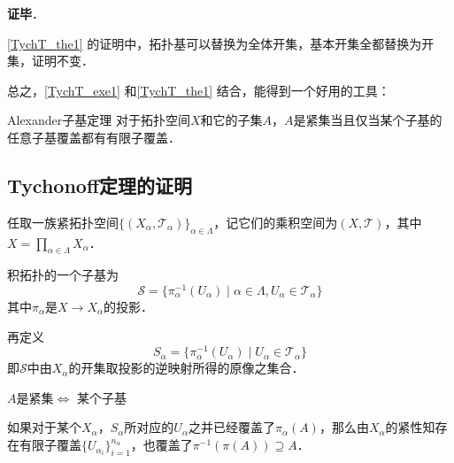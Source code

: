 \textbf{证毕}．



\autoref{TychT_the1} 的证明中，拓扑基可以替换为全体开集，基本开集全都替换为开集，证明不变．

总之，\autoref{TychT_exe1} 和\autoref{TychT_the1} 结合，能得到一个好用的工具：

\begin{corollary}{Alexander子基定理}
对于拓扑空间$X$和它的子集$A$，$A$是紧集当且仅当某个子基的任意子基覆盖都有有限子覆盖．
\end{corollary}




\subsection{Tychonoff定理的证明}

任取一族紧拓扑空间$\{(X_\alpha, \mathcal{T}_\alpha)\}_{\alpha\in \Lambda}$，记它们的乘积空间为$(X, \mathcal{T})$，其中$X=\prod_{\alpha\in\Lambda}X_\alpha$．

积拓扑的一个子基为
\begin{equation}
\mathcal{S} = \{\pi_\alpha^{-1}(U_\alpha)\mid \alpha\in\Lambda, U_\alpha\in \mathcal{T}_\alpha\}
\end{equation}
其中$\pi_\alpha$是$X\to X_\alpha$的投影．

再定义
\begin{equation}
S_\alpha = \{\pi_\alpha^{-1}(U_\alpha)\mid U_\alpha\in \mathcal{T}_\alpha\}
\end{equation}
即$\mathcal{S}$中由$X_\alpha$的开集取投影的逆映射所得的原像之集合．

$A$是紧集$\iff$ 某个子基

如果对于某个$X_\alpha$，$S_\alpha$所对应的$U_\alpha$之并已经覆盖了$\pi_\alpha(A)$，那么由$X_\alpha$的紧性知存在有限子覆盖$\{U_{\alpha_i}\}_{i=1}^{n_\alpha}$，也覆盖了$\pi^{-1}(\pi(A))\supseteq A$．

















